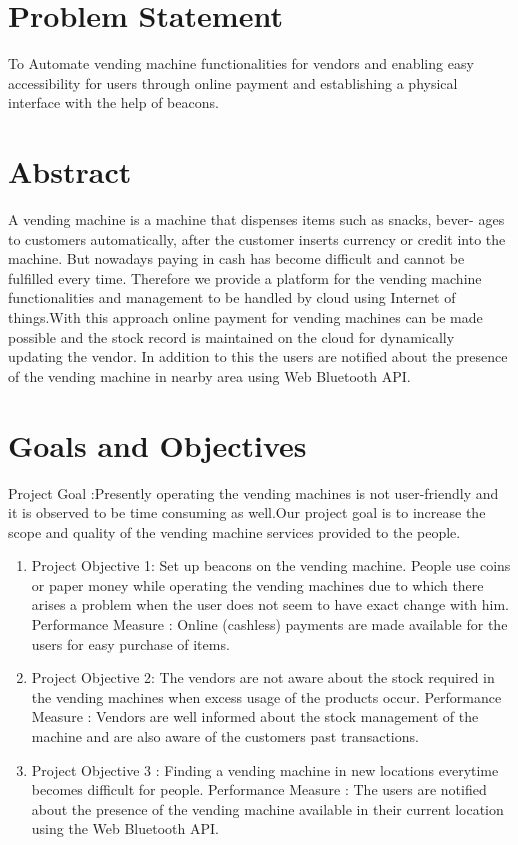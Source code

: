 \documentclass[oneside,a4paper,12pt]{report}
\begin{document}
\section{Problem Statement}
\label{sec:problem}
        To Automate vending machine functionalities for vendors and enabling easy accessibility for users through online payment and establishing a physical interface with the help of beacons. 
\section{Abstract}
A vending machine is a machine that dispenses items such as snacks, bever-
ages to customers automatically, after the customer inserts currency or credit
into the machine. But nowadays paying in cash has become difficult and cannot be fulfilled every time. Therefore we provide a platform for the vending machine functionalities and management to be handled by cloud using Internet of things.With this approach online payment for vending machines can be made possible and the
stock record is maintained on the cloud for dynamically updating the vendor.
In addition to this the users are notified about the presence of the vending
machine in nearby area  using Web Bluetooth API.
		    		   
\section{Goals and Objectives}
Project Goal :Presently operating the vending machines is not user-friendly and it is observed to be time consuming as well.Our project goal is to increase the scope and quality of the vending machine services provided to the people. 
\begin{enumerate}

\item Project Objective 1:
Set up beacons on the vending machine.
People use coins or paper money while operating the vending machines due to which there arises a problem when the user does not seem to have exact change with him.
Performance Measure :
Online (cashless) payments are made available for the users for easy purchase of items.
\item Project Objective 2:
The vendors are not aware about the stock required in the vending machines when excess usage of the products occur.
Performance Measure :
Vendors are well informed about the stock management of the machine and are also aware of the customers past transactions.
\item Project Objective 3 :
Finding a vending machine in new locations everytime becomes difficult for people.
Performance Measure :
The users are notified about the presence of the vending machine available in their current location using the Web Bluetooth API.

\end{enumerate}	
\end{document}
